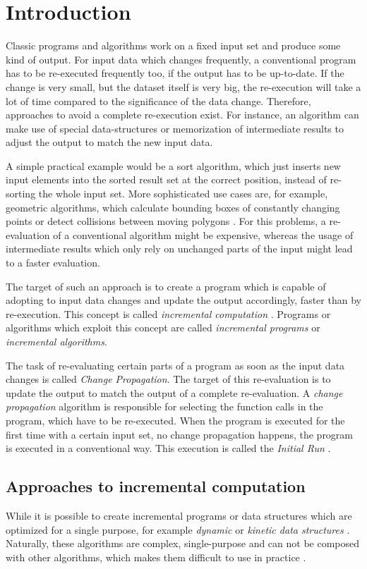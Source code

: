 \section{Introduction}
Classic programs and algorithms work on a fixed input set and produce some kind of output. For input data which changes frequently, a conventional program has to be re-executed frequently too, if the output has to be up-to-date. If the change is very small, but the dataset itself is very big, the re-execution will take a lot of time compared to the significance of the data change. Therefore, approaches to avoid a complete re-execution exist. For instance, an algorithm can make use of special data-structures or memorization of intermediate results to adjust the output to match the new input data.

A simple practical example would be a sort algorithm, which just inserts new input elements into the sorted result set at the correct position, instead of re-sorting the whole input set. More sophisticated use cases are, for example, geometric algorithms, which calculate bounding boxes of constantly changing points \cite{yu2008practical} or detect collisions between moving polygons \cite{basch2004kinetic}. For this problems, a re-evaluation of a conventional algorithm might be expensive, whereas the usage of intermediate results which only rely on unchanged parts of the input might lead to a faster evaluation. 

 The target of such an approach is to create a program which is capable of adopting to input data changes and update the output accordingly, faster than by re-execution. This concept is called \textit{incremental computation} \cite{Ramalingam:IncrementalBibliography}. Programs or algorithms which exploit this concept are called \textit{incremental programs} or \textit{incremental algorithms}. 

The task of re-evaluating certain parts of a program as soon as the input data changes is called \textit{Change Propagation}. The target of this re-evaluation is to update the output to match the output of a complete re-evaluation. A \textit{change propagation} algorithm is responsible for selecting the function calls in the program, which have to be re-executed. When the program is executed for the first time with a certain input set, no change propagation happens, the program is executed in a conventional way. This execution is called the \textit{Initial Run} \cite{Acar2005thesis}.

\subsection{Approaches to incremental computation}
While it is possible to create incremental programs or data structures which are optimized for a single purpose, for example \textit{dynamic} or \textit{kinetic data structures} \cite{Guibas98kineticdata}. Naturally, these algorithms are complex, single-purpose and can not be composed with other algorithms, which makes them difficult to use in practice \cite{Acar2005thesis}. 
 
